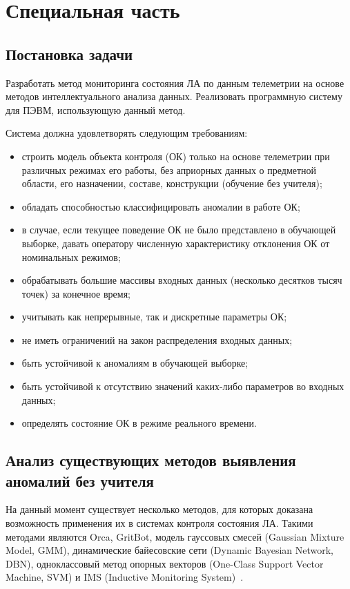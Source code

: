 \chapter{Специальная часть}
\section{Постановка задачи}
\label{sec:spec:ProblemDefinition}
Разработать метод мониторинга состояния ЛА по данным телеметрии на основе методов интеллектуального анализа данных. Реализовать программную систему для ПЭВМ, использующую данный метод.

Система должна удовлетворять следующим требованиям:
\begin{itemize}
	\item строить модель объекта контроля (ОК) только на основе телеметрии при различных режимах его работы, без априорных данных о предметной области, его назначении, составе, конструкции (обучение без учителя);
	\item обладать способностью классифицировать аномалии в работе ОК;
	\item в случае, если текущее поведение ОК не было представлено в обучающей выборке, давать оператору численную характеристику отклонения ОК от номинальных режимов;
	\item обрабатывать большие массивы входных данных (несколько десятков тысяч точек) за конечное время;
	\item учитывать как непрерывные, так и дискретные параметры ОК;
	\item не иметь ограничений на закон распределения входных данных;
	\item быть устойчивой к аномалиям в обучающей выборке;
	\item быть устойчивой к отсутствию значений каких-либо параметров во входных данных;
	\item определять состояние ОК в режиме реального времени.
\end{itemize}

\section{Анализ существующих методов выявления аномалий без учителя}
На данный момент существует несколько методов, для которых доказана возможность применения их в системах контроля состояния ЛА. Такими методами являются Orca, GritBot, модель гауссовых смесей (Gaussian Mixture Model, GMM), динамические байесовские сети (Dynamic Bayesian Network, DBN), одноклассовый метод опорных векторов (One-Class Support Vector Machine, SVM) и IMS (Inductive Monitoring System)~\cite{MartinCompUnsupervisedDetectionMethods}.

